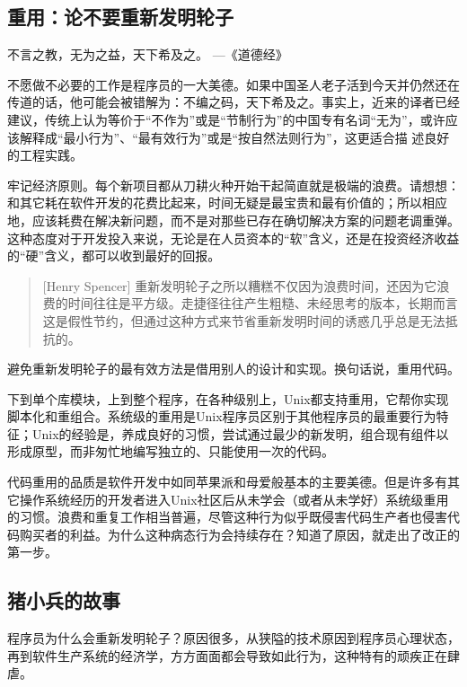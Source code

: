 \documentclass[12pt,oneside]{ctexbook}
\begin{document}
\begin{common-format}
\chapter{重用：论不要重新发明轮子}
\begin{flushright}
\begin{notecard}{15em}
不言之教，无为之益，天下希及之。
{\hfill —《道德经》}
\end{notecard}
\end{flushright}

不愿做不必要的工作是程序员的一大美德。如果中国圣人老子活到今天并仍然还在传道的话，他可能会被错解为：不编之码，天下希及之。事实上，近来的译者已经建议，传统上认为等价于“不作为”或是“节制行为”的中国专有名词“无为”，或许应该解释成“最小行为”、“最有效行为”或是“按自然法则行为”，这更适合描
述良好的工程实践。

牢记经济原则。每个新项目都从刀耕火种开始干起简直就是极端的浪费。请想想：和其它耗在软件开发的花费比起来，时间无疑是最宝贵和最有价值的；所以相应地，应该耗费在解决新问题，而不是对那些已存在确切解决方案的问题老调重弹。这种态度对于开发投入来说，无论是在人员资本的“软”含义，还是在投资经济收益的“硬”含义，都可以收到最好的回报。

\begin{quote}[Henry Spencer]
重新发明轮子之所以糟糕不仅因为浪费时间，还因为它浪费的时间往往是平方级。走捷径往往产生粗糙、未经思考的版本，长期而言这是假性节约，但通过这种方式来节省重新发明时间的诱惑几乎总是无法抵抗的。
\end{quote}

避免重新发明轮子的最有效方法是借用别人的设计和实现。换句话说，重用代码。

下到单个库模块，上到整个程序，在各种级别上，Unix都支持重用，它帮你实现脚本化和重组合。系统级的重用是Unix程序员区别于其他程序员的最重要行为特征；Unix的经验是，养成良好的习惯，尝试通过最少的新发明，组合现有组件以形成原型，而非匆忙地编写独立的、只能使用一次的代码。

代码重用的品质是软件开发中如同苹果派和母爱般基本的主要美德。但是许多有其它操作系统经历的开发者进入Unix社区后从未学会（或者从未学好）系统级重用的习惯。浪费和重复工作相当普遍，尽管这种行为似乎既侵害代码生产者也侵害代码购买者的利益。为什么这种病态行为会持续存在？知道了原因，就走出了改正的第一步。

\section{猪小兵的故事}
程序员为什么会重新发明轮子？原因很多，从狭隘的技术原因到程序员心理状态，再到软件生产系统的经济学，方方面面都会导致如此行为，这种特有的顽疾正在肆虐。


\end{common-format}
\end{document}
